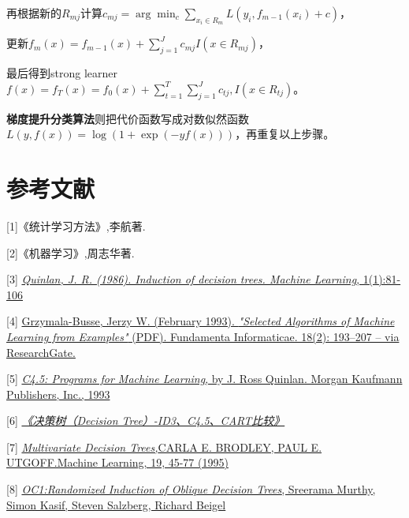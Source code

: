 \documentclass[cn]{elegantpaper}
\begin{document}
再根据新的$R_{mj}$计算$c_{m j}=\arg \min _{c} \sum_{x_{i} \in R_{m}} L\left(y_{i}, f_{m-1}\left(x_{i}\right)+c\right)$，

更新$f_{m}(x)=f_{m-1}(x)+\sum_{j=1}^{J} c_{m j} I\left(x \in R_{m j}\right)$，

最后得到strong learner $f(x)=f_{T}(x)=f_{0}(x)+\sum_{t=1}^{T} \sum_{j=1}^{J} c_{t j}, I\left(x \in R_{t j}\right)$。


\textbf{梯度提升分类算法}则把代价函数写成对数似然函数$L(y, f(x))=\log (1+\exp (-y f(x)))$，再重复以上步骤。








































\section{参考文献}
[1]《统计学习方法》,李航著.

[2]《机器学习》,周志华著.

[3] \href{https://link.springer.com/article/10.1007/BF00116251}{\emph{Quinlan, J. R. (1986). Induction of decision trees. Machine Learning}, 1(1):81-106}

[4] \href{https://pdfs.semanticscholar.org/bfd1/d49de1797a063ef855fd96a5bae08e471879.pdf}{Grzymala-Busse, Jerzy W. (February 1993). \emph{"Selected Algorithms of Machine Learning from Examples" }(PDF). Fundamenta Informaticae. 18(2): 193–207 – via ResearchGate.}

[5] \href{https://link.springer.com/article/10.1007/BF00993309}{\emph{C4.5: Programs for Machine Learning}, by J. Ross Quinlan. Morgan Kaufmann Publishers, Inc., 1993}

[6] \href{https://www.cnblogs.com/huangyc/p/9768858.html#_label1_1}{\emph{《决策树（Decision Tree）-ID3、C4.5、CART比较》}}

[7] \href{http://citeseerx.ist.psu.edu/viewdoc/download?doi=10.1.1.55.7328&rep=rep1&type=pdf}{\emph{Multivariate Decision Trees,}CARLA E. BRODLEY, PAUL E. UTGOFF.Machine Learning, 19, 45-77 (1995) }

[8] \href{https://www.aaai.org/Papers/AAAI/1993/AAAI93-049.pdf}{\emph{OC1:Randomized Induction of Oblique Decision Trees}, Sreerama Murthy, Simon Kasif, Steven Salzberg, Richard Beigel }
\end{document}
